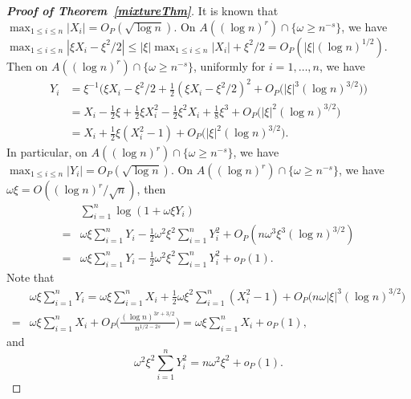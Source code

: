 \documentclass[11pt]{article}
\theoremstyle{plain}
\theoremstyle{definition}
\theoremstyle{remark}
\begin{document}
\begin{appendices}
\begin{proof}[\textbf{Proof of Theorem~\ref{mixtureThm}}]
It is known that $\max_{1\leq i \leq n}|X_i|=O_P(\sqrt{\log n})$.
On $A((\log n)^r)\cap \{\omega\geq n^{-s}\}$, we have $\max_{1\leq i\leq n}|\xi X_i-\xi^2/2|\leq |\xi| \max_{1\leq i\leq n}|X_i|+\xi^2/2=O_P(|\xi|(\log n)^{1/2})$.
Then on $A((\log n)^r)\cap \{\omega\geq n^{-s}\}$, uniformly for $i=1,\ldots, n$, we have
\begin{align*}
    Y_i&=\xi^{-1}\Big(\xi X_i-\xi^2/2 +\frac{1}{2}(\xi X_i-\xi^2/2)^2+O_P \big(|\xi|^3 (\log n)^{3/2}\big)\Big) 
    \\
    &=X_i-\frac{1}{2}\xi+\frac{1}{2} \xi X_i^2-\frac{1}{2} \xi^2 X_i +\frac{1}{8}\xi^3+O_P \big(|\xi|^2 (\log n)^{3/2}\big)
    \\
    &=X_i+\frac{1}{2} \xi (X_i^2-1) + O_P \big(|\xi|^2 (\log n)^{3/2}\big).
\end{align*}
In particular, on $A((\log n)^r)\cap \{\omega\geq n^{-s}\}$, we have $\max_{1\leq i \leq n}|Y_i|=O_P(\sqrt{\log n})$.
On $A((\log n)^r)\cap \{\omega\geq n^{-s}\}$, we have $\omega \xi =O((\log n)^r /\sqrt{n})$, then
\begin{align*}
    &\sum_{i=1}^n \log(1+\omega \xi Y_i)
    \\
    =& \omega \xi\sum_{i=1}^n Y_i -\frac{1}{2} \omega^2 \xi^2 \sum_{i=1}^n Y_i^2+O_P(n\omega^3 \xi^3 (\log n)^{3/2})
    \\
    =& \omega \xi\sum_{i=1}^n Y_i -\frac{1}{2} \omega^2 \xi^2 \sum_{i=1}^n Y_i^2+o_P(1).
\end{align*}
Note that
\begin{align*}
    &\omega \xi\sum_{i=1}^n Y_i
    =
    \omega \xi\sum_{i=1}^n 
    X_i+\frac{1}{2} \omega \xi^2\sum_{i=1}^n (X_i^2-1) + O_P \big(n\omega |\xi|^3 (\log n)^{3/2}\big)
    \\
    =&
    \omega \xi\sum_{i=1}^n X_i + O_P\Big( \frac{(\log n)^{3r+3/2}}{n^{1/2-2s}}\Big)
=
\omega \xi\sum_{i=1}^n X_i + o_P(1),
\end{align*}
and
\begin{equation*}
    \omega^2 \xi^2 \sum_{i=1}^n Y_i^2=n\omega^2 \xi^2 +o_P(1).
\end{equation*}


\end{proof}
\end{appendices}
\end{document}
